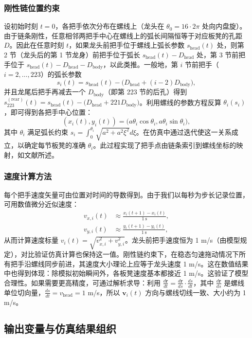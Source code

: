 \documentclass[UTF8]{ctexart}
\newcommand{\vect}[1]{\mathbf{#1}}
\begin{document}
\subsubsection{刚性链位置约束}
设初始时刻 $t=0$，各把手依次分布在螺线上（龙头在 $\theta_0=16 \cdot 2\pi$ 处向内盘旋）。由于链条刚性，任意相邻两把手中心在螺线上的弧长间隔恒等于对应板凳的孔距 $D$。因此在任意时刻 $t$，如果龙头前把手位于螺线上弧长参数 $s_{\text{head}}(t)$ 处，则第 2 节（龙头后的第 1 节龙身）前把手位于弧长 $s_{\text{head}}(t) - D_{\text{head}}$ 处，第 3 节前把手位于 $s_{\text{head}}(t) - D_{\text{head}} - D_{\text{body}}$，以此类推。一般地，第 $i$ 节前把手（$i=2,\dots,223$）的弧长参数
\[
s_i(t) = s_{\text{head}}(t) - \Big(D_{\text{head}} + (i-2)D_{\text{body}}\Big),
\]
并且龙尾后把手再减去一个 $D_{\text{body}}$（即第 223 节的后孔）得到 $s_{223}^{(\text{rear})}(t)=s_{\text{head}}(t)-\big(D_{\text{head}}+221 D_{\text{body}}\big)$。利用螺线的参数方程反算 $\theta_i(s_i)$，即可得到各把手中心位置：
\[
(x_i(t),y_i(t)) = \big(a\theta_i\cos\theta_i, a\theta_i\sin\theta_i\big),
\]
其中 $\theta_i$ 满足弧长约束 $s_i=\int_0^{\theta_i}\sqrt{a^2+a^2\xi^2}d\xi$。在仿真中通过迭代使这一关系成立，以确定每节板凳的准确 $\theta_i$。此过程实现了把手点由链条索引到螺线坐标的映射，如文献所述。

\subsubsection{速度计算方法}
每个把手速度矢量可由位置对时间的导数得到。由于我们以每秒为步长记录位置，可用数值微分近似速度：
\begin{align*}
v_{x,i}(t) &\approx \frac{x_i(t+1)-x_i(t)}{1\ \text{s}}, \\
v_{y,i}(t) &\approx \frac{y_i(t+1)-y_i(t)}{1\ \text{s}},
\end{align*}
从而计算速度标量 $v_i(t)=\sqrt{v_{x,i}^2+v_{y,i}^2}$。龙头前把手速度恒为 1 m/s（由模型规定），对比验证仿真计算也保持这一值。刚性链约束下，在稳态匀速拖动情况下所有把手沿螺线同步前进，其速度大小理论上应等于龙头速度 1 m/s。这在数值结果中也得到体现：除模拟初始瞬间外，各板凳速度基本都接近 1 m/s。这验证了模型合理性。如果需要更高精度，可通过解析求导：利用 $\frac{d\vect{r}}{dt}=\frac{d\vect{r}}{ds} \cdot \frac{ds}{dt}$，其中 $\frac{d\vect{r}}{ds}$ 是螺线单位切向量，$\frac{ds}{dt}=v_{\text{head}}=1$ m/s，所以 $\vect{v}_i(t)$ 方向与螺线切线一致、大小约为 1 m/s。

\subsection{输出变量与仿真结果组织}
\end{document}
